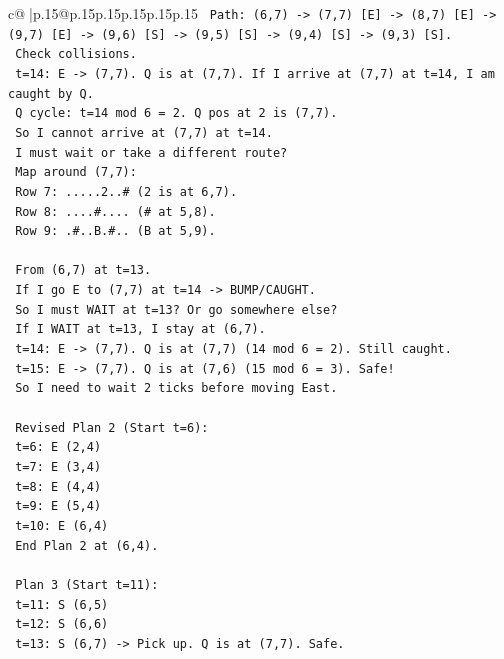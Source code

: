 \documentclass{article}
\begin{document}
{\begin{supertabular}{c@{$\;$}|p{.15\linewidth}@{}p{.15\linewidth}p{.15\linewidth}p{.15\linewidth}p{.15\linewidth}p{.15\linewidth}}
{{{\texttt{   Path: (6,7) {-}> (7,7) {[}E{]} {-}> (8,7) {[}E{]} {-}> (9,7) {[}E{]} {-}> (9,6) {[}S{]} {-}> (9,5) {[}S{]} {-}> (9,4) {[}S{]} {-}> (9,3) {[}S{]}.} \\
\texttt{   Check collisions.} \\
\texttt{   t=14: E {-}> (7,7). Q is at (7,7). If I arrive at (7,7) at t=14, I am caught by Q.} \\
\texttt{   Q cycle: t=14 mod 6 = 2. Q pos at 2 is (7,7).} \\
\texttt{   So I cannot arrive at (7,7) at t=14.} \\
\texttt{   I must wait or take a different route?} \\
\texttt{   Map around (7,7):} \\
\texttt{   Row 7: .....2..\# (2 is at 6,7).} \\
\texttt{   Row 8: ....\#.... (\# at 5,8).} \\
\texttt{   Row 9: .\#..B.\#.. (B at 5,9).} \\
\\ 
\texttt{   From (6,7) at t=13.} \\
\texttt{   If I go E to (7,7) at t=14 {-}> BUMP/CAUGHT.} \\
\texttt{   So I must WAIT at t=13? Or go somewhere else?} \\
\texttt{   If I WAIT at t=13, I stay at (6,7).} \\
\texttt{   t=14: E {-}> (7,7). Q is at (7,7) (14 mod 6 = 2). Still caught.} \\
\texttt{   t=15: E {-}> (7,7). Q is at (7,6) (15 mod 6 = 3). Safe!} \\
\texttt{   So I need to wait 2 ticks before moving East.} \\
\\ 
\texttt{   Revised Plan 2 (Start t=6):} \\
\texttt{   t=6: E (2,4)} \\
\texttt{   t=7: E (3,4)} \\
\texttt{   t=8: E (4,4)} \\
\texttt{   t=9: E (5,4)} \\
\texttt{   t=10: E (6,4)} \\
\texttt{   End Plan 2 at (6,4).} \\
\\ 
\texttt{   Plan 3 (Start t=11):} \\
\texttt{   t=11: S (6,5)} \\
\texttt{   t=12: S (6,6)} \\
\texttt{   t=13: S (6,7) {-}> Pick up. Q is at (7,7). Safe.} \\
}}}
\end{supertabular}}
\end{document}
